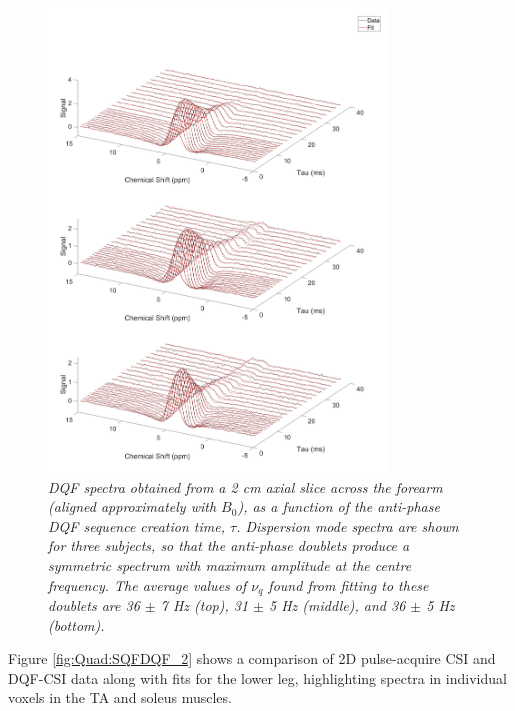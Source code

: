 \begin{figure}
    \centering
    \includegraphics[width=0.8\textwidth]{Figures/Quad/Bulk_DQF_2.png}
    \caption{\textit{\ac{DQF} spectra obtained from a 2 cm axial slice across the forearm (aligned approximately with $B_0$), as a function of the anti-phase \ac{DQF} sequence creation time, $\tau$. Dispersion mode spectra are shown for three subjects, so that the anti-phase doublets produce a symmetric spectrum with maximum amplitude at the centre frequency. The average values of $\nu_q$ found from fitting to these doublets are 36 $\pm$ 7 Hz (top), 31 $\pm$ 5 Hz (middle), and 36 $\pm$ 5 Hz (bottom).}}
    \label{fig:Quad:Bulk_DQF_2}
\end{figure}

Figure \ref{fig:Quad:SQFDQF_2} shows a comparison of 2D pulse-acquire \ac{CSI} and \ac{DQF}-\ac{CSI} data along with fits for the lower leg, highlighting spectra in individual voxels in the \ac{TA} and soleus muscles. 

